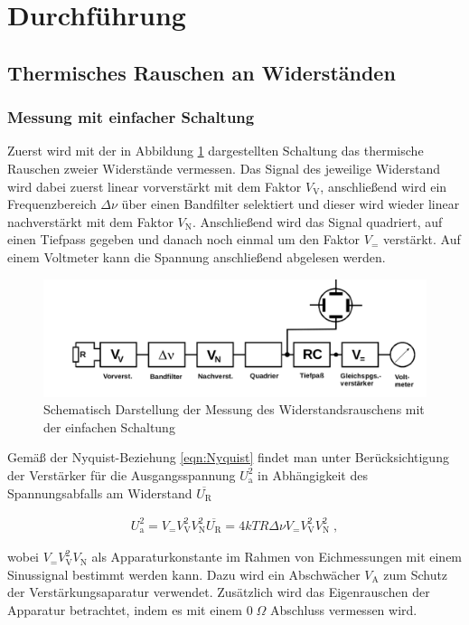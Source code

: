 \section{Durchführung}
\subsection{Thermisches Rauschen an Widerständen}
\subsubsection{Messung mit einfacher Schaltung}
Zuerst wird mit der in Abbildung \ref{FIG:EinfacheSchaltung} dargestellten Schaltung das thermische Rauschen zweier Widerstände vermessen. Das Signal des jeweilige Widerstand wird dabei zuerst linear vorverstärkt mit dem Faktor $V_{\textrm{V}}$, anschließend wird ein Frequenzbereich $\Delta \nu$ über einen Bandfilter selektiert und dieser wird wieder linear nachverstärkt mit dem Faktor $V_{\textrm{N}}$. Anschließend wird das Signal quadriert, auf einen Tiefpass gegeben und danach noch einmal um den Faktor $V_{=}$ verstärkt. Auf einem Voltmeter kann die Spannung anschließend abgelesen werden.

\begin{figure}[htbp]
	\centering
	\includegraphics[width=0.8\linewidth,height=0.5\textheight,keepaspectratio]{bilder/EinfacheSchaltung.png}
	\caption{Schematisch Darstellung der Messung des Widerstandsrauschens mit der einfachen Schaltung \cite{Anl}}
	\label{FIG:EinfacheSchaltung}
\end{figure}

Gemäß der Nyquist-Beziehung \eqref{eqn:Nyquist} findet man unter Berücksichtigung der Verstärker für die Ausgangsspannung $U^2_{\textrm{a}}$ in Abhängigkeit des Spannungsabfalls am Widerstand $\overline{U_{\textrm{R}}}$

\begin{align}
U^2_{\textrm{a}} = V_{=}V_{\textrm{V}}^2V_{\textrm{N}}^2\overline{U_{\textrm{R}}} = 4kTR\Delta\nu V_{=}V_{\textrm{V}}^2V_{\textrm{N}}^2 \;,
\end{align}

wobei $V_{=}V_{\textrm{V}}^2V_{\textrm{N}}$ als Apparaturkonstante im Rahmen von Eichmessungen mit einem Sinussignal bestimmt werden kann. Dazu wird ein Abschwächer $V_{\textrm{A}}$ zum Schutz der Verstärkungsaparatur verwendet. Zusätzlich wird das Eigenrauschen der Apparatur betrachtet, indem es mit einem $0\;\Omega$ Abschluss vermessen wird.


